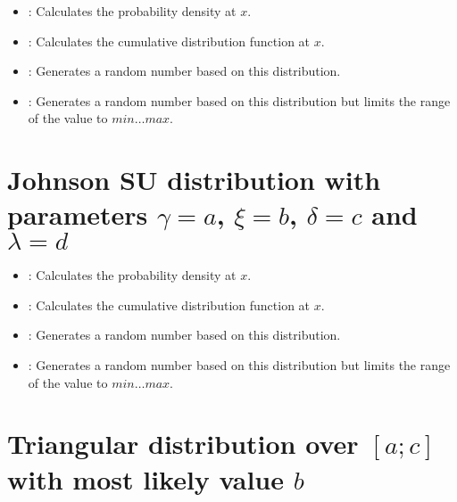 \begin{itemize}

\item
{}:
Calculates the probability density at $x$.

\item
{}:
Calculates the cumulative distribution function at $x$.

\item
{}:
Generates a random number based on this distribution.

\item
{}:
Generates a random number based on this distribution but limits the range of the value to $min\ldots max$.

\end{itemize}



\section{Johnson SU distribution with parameters \texorpdfstring{$\gamma=a$}{a}, \texorpdfstring{$\xi=b$}{b}, \texorpdfstring{$\delta=c$}{c} and \texorpdfstring{$\lambda=d$}{d}}

\begin{itemize}

\item
{}:
Calculates the probability density at $x$.

\item
{}:
Calculates the cumulative distribution function at $x$.

\item
{}:
Generates a random number based on this distribution.

\item
{}:
Generates a random number based on this distribution but limits the range of the value to $min\ldots max$.

\end{itemize}



\section{Triangular distribution over \texorpdfstring{$[a;c]$}{[a;c]} with most likely value \texorpdfstring{$b$}{b}}

